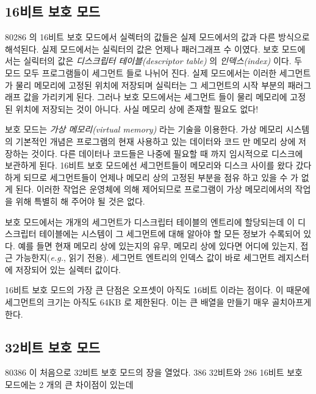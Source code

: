 \subsection{16비트 보호 모드}

80286 의 16비트 보호 모드에서 실렉터의 값들은 실제 모드에서의 값과 다른 방식으로 해석된다. 실제 모드에서는 실릭터의 값은
언제나 패러그래프 수 이였다. 보호 모드에서는 실릭터의 값은 \emph{디스크립터 테이블(descriptor table)} 의 \emph{인덱스(index)} 이다.  
두 모드 모두 프로그램들이 세그먼트  들로 나뉘어 진다. 실제 모드에서는 이러한 세그먼트가 물리 메모리에 
고정된 위치에 저장되며 실릭터는 그 세그먼트의 시작 부분의 패러그래프 값을 가리키게 된다. 그러나 보호 모드에서는 세그먼트 들이 물리 메모리에
고정된 위치에 저장되는 것이 아니다. 사실 메모리 상에 존재할 필요도 없다!

보호 모드는 \emph{가상 메모리(virtual memory)} 라는 기술을 이용한다.  가상 메모리 시스템의 기본적인 개념은
프로그램의 현재 사용하고 있는 데이터와 코드 만 메모리 상에 저장하는 것이다. 다른 데이터나 코드들은 나중에 필요할 때 까지 임시적으로
디스크에 보관하게 된다. 16비트 보호 모드에선 세그먼트들이 메모리와 디스크 사이를 왔다 갔다 하게 되므로 세그먼트들이 언제나 
메모리 상의 고정된 부분을 점유 하고 있을 수 가 없게 된다. 이러한 작업은 운영체에 의해 제어되므로 프로그램이 가상 메모리에서의 작업을
위해 특별히 해 주어야 될 것은 없다. 

보호 모드에서는 개개의 세그먼트가 디스크립터 테이블의 엔트리에 할당되는데 이 디스크립터 테이블에는 시스템이 그 세그먼트에 대해 알아야
할 모든 정보가 수록되어 있다. 예를 들면 현재 메모리 상에 있는지의 유무, 메모리 상에 있다면 어디에 있는지, 접근 가능한지({\em e.g.\/}, 읽기 전용).
세그먼트 엔트리의 인덱스 값이 바로 세그먼트 레지스터에 저장되어 있는 실렉터 값이다. 

16비트 보호 모드의 가장 큰 단점은 오프셋이 아직도 16비트 이라는 점이다. 이 때문에 세그먼트의 크기는 아직도 64KB 로 제한된다. 이는 큰 
배열을 만들기 매우 골치아프게 한다. 

\subsection{32비트 보호 모드}

80386 이 처음으로 32비트 보호 모드의 장을 열었다. 386 32비트와 286 16비트 보호 모드에는 2 개의 큰 차이점이 있는데

